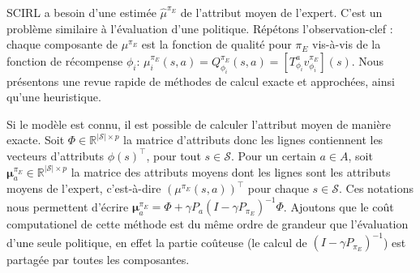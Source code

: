 \documentclass[english,utf8]{./hermes-journal}
\newcommand{\s}{\mathcal{S}}
\newcommand{\A}{\mathcal{A}}
\newcommand{\Mu}{\boldsymbol{\mu}}
\begin{document}
SCIRL a besoin d'une estimée $\hat{\mu}^{\pi_E}$ de l'attribut moyen de l'expert. C'est un problème similaire à l'évaluation d'une politique. Répétons l'observation-clef : chaque composante de 
$\mu^{\pi_E}$ est la fonction de qualité pour $\pi_E$ vis-à-vis de la fonction de récompense $\phi_i$: $\mu_i^{\pi_E}(s,a) = Q^{\pi_E}_{\phi_i}(s,a) =
[T^a_{\phi_i} v^{\pi_E}_{\phi_i}](s)$. Nous présentons une revue rapide de méthodes de calcul exacte et approchées, ainsi qu'une heuristique.

Si le modèle est connu, il est possible de calculer l'attribut moyen de manière exacte. Soit $\Phi\in\mathbb{R}^{|\s|\times p}$ la matrice d'attributs donc les lignes contiennent les vecteurs d'attributs $\phi(s)^\top$, pour tout
$s\in\s$.
%
%
Pour un certain $a\in A$, soit $\Mu^{\pi_E}_a \in\mathbb{R}^{|\s|\times
p}$ la matrice des attributs moyens dont les lignes sont les attributs moyens de l'expert, c'est-à-dire  $(\mu^{\pi_E}(s,a))^\top$ pour chaque $s\in\s$.
Ces notations nous permettent d'écrire $\Mu_a^{\pi_E} = \Phi + \gamma
P_a(I-\gamma P_{\pi_E})^{-1} \Phi$.
Ajoutons que le coût computationel de cette méthode est du même ordre de grandeur que l'évaluation d'une seule politique, en effet la partie coûteuse (le calcul de $(I-\gamma P_{\pi_E})^{-1}$) est partagée par toutes les composantes.
\end{document}
